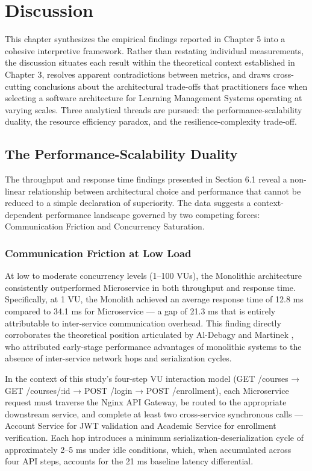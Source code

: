 \chapter{Discussion}

This chapter synthesizes the empirical findings reported in Chapter 5 into a cohesive interpretive framework. Rather than restating individual measurements, the discussion situates each result within the theoretical context established in Chapter 3, resolves apparent contradictions between metrics, and draws cross-cutting conclusions about the architectural trade-offs that practitioners face when selecting a software architecture for Learning Management Systems operating at varying scales. Three analytical threads are pursued: the performance-scalability duality, the resource efficiency paradox, and the resilience-complexity trade-off.

\section{The Performance-Scalability Duality}

The throughput and response time findings presented in Section 6.1 reveal a non-linear relationship between architectural choice and performance that cannot be reduced to a simple declaration of superiority. The data suggests a context-dependent performance landscape governed by two competing forces: Communication Friction and Concurrency Saturation.

\subsection{Communication Friction at Low Load}

At low to moderate concurrency levels (1–100 VUs), the Monolithic architecture consistently outperformed Microservice in both throughput and response time. Specifically, at 1 VU, the Monolith achieved an average response time of 12.8 ms compared to 34.1 ms for Microservice — a gap of 21.3 ms that is entirely attributable to inter-service communication overhead. This finding directly corroborates the theoretical position articulated by Al-Debagy and Martinek \cite{Omar_Al-Debagy}, who attributed early-stage performance advantages of monolithic systems to the absence of inter-service network hops and serialization cycles.

In the context of this study's four-step VU interaction model (GET /courses → GET /courses/:id → POST /login → POST /enrollment), each Microservice request must traverse the Nginx API Gateway, be routed to the appropriate downstream service, and complete at least two cross-service synchronous calls — Account Service for JWT validation and Academic Service for enrollment verification. Each hop introduces a minimum serialization-deserialization cycle of approximately 2–5 ms under idle conditions, which, when accumulated across four API steps, accounts for the 21 ms baseline latency differential.

